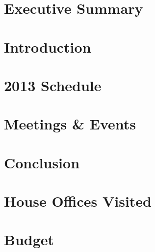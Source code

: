 \documentclass[12pt]{article}
\begin{document}


\newpage
\tableofcontents
\thispagestyle{empty}

\begin{doublespace}

\newpage
\section{Executive Summary}


\newpage
\setcounter{page}{1} 
\section{Introduction}


\newpage
\section{2013 Schedule}


\newpage
\section{Meetings \& Events}


\newpage
\section{Conclusion}


\appendix

\newpage
\section{House Offices Visited}\label{sec:house}


\newpage
\section{Budget}\label{sec:budget}





\end{doublespace}
\end{document}
